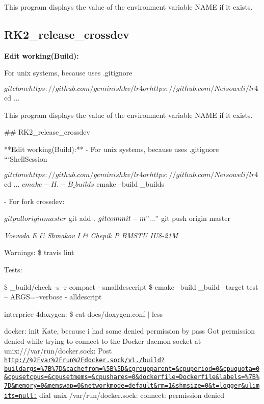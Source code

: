 This program displays the value of the environment variable N\+A\+ME if it exists.

\subsection*{R\+K2\+\_\+release\+\_\+crossdev}

{\bfseries Edit working(\+Build)\+:}
\begin{DoxyItemize}
\item For unix systems, because uses .gitignore 
\begin{DoxyCode}
$ git clone https://github.com/geminishkv/lr4 or https://github.com/Neisoweli/lr4
$ cd ...


This program displays the value of the environment variable NAME if it exists. 


## RK2\_release\_crossdev

**Edit working(Build):**
- For unix systems, because uses .gitignore 
```ShellSession

$ git clone https://github.com/geminishkv/lr4 or https://github.com/Neisoweli/lr4
$ cd ...
$ cmake -H. -B\_builds
$ cmake --build \_builds

- For fork crossdev:


$ git pull origin master
$ git add .
$ git commit -m"..."
$ git push origin master
\end{DoxyCode}

\end{DoxyItemize}

{\itshape Voevoda E \& Shmakov I \& Chepik P B\+M\+S\+TU I\+U8-\/21M}

Warnings\+: \$ travis lint

Tests\+:

\$ \+\_\+build/check -\/s -\/r compact -\/ smalldesccript \$ cmake --build \+\_\+build --target test -- A\+R\+GS=--verbose -\/ alldescript

interprice 4doxygen\+: \$ cat docs/doxygen.\+conf $\vert$ less

docker\+: init Kate, because i had some denied permission by pass Got permission denied while trying to connect to the Docker daemon socket at unix\+:///var/run/docker.sock\+: Post \href{http://%2Fvar%2Frun%2Fdocker.sock/v1.26/build?buildargs=%7B%7D&cachefrom=%5B%5D&cgroupparent=&cpuperiod=0&cpuquota=0&cpusetcpus=&cpusetmems=&cpushares=0&dockerfile=Dockerfile&labels=%7B%7D&memory=0&memswap=0&networkmode=default&rm=1&shmsize=0&t=logger&ulimits=null:}{\tt http\+://\%2\+Fvar\%2\+Frun\%2\+Fdocker.\+sock/v1.\+26/build?buildargs=\%7\+B\%7\+D\&cachefrom=\%5\+B\%5\+D\&cgroupparent=\&cpuperiod=0\&cpuquota=0\&cpusetcpus=\&cpusetmems=\&cpushares=0\&dockerfile=\+Dockerfile\&labels=\%7\+B\%7\+D\&memory=0\&memswap=0\&networkmode=default\&rm=1\&shmsize=0\&t=logger\&ulimits=null\+:} dial unix /var/run/docker.sock\+: connect\+: permission denied

